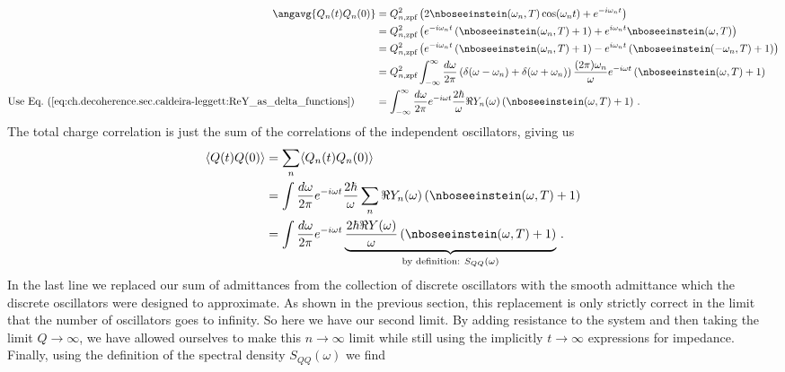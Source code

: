 \begin{align}
  \angavg{Q_n(t) Q_n(0)}
  &= Q_{n,\text{zpf}}^2 \left( 2 \nboseeinstein(\omega_n, T) \cos(\omega_n t) + e^{-i \omega_n t} \right) \nonumber \\
  &= Q_{n,\text{zpf}}^2 \left( e^{-i \omega_n t} \left( \nboseeinstein (\omega_n, T) + 1 \right) + e^{i \omega_n t} \nboseeinstein(\omega, T) \right) \nonumber \\
  &= Q_{n,\text{zpf}}^2 \left( e^{-i \omega_n t} \left( \nboseeinstein (\omega_n, T) + 1 \right) - e^{i \omega_n t} \left( \nboseeinstein(-\omega_n, T) + 1 \right) \right) \nonumber \\
  &= Q_{n,\text{zpf}}^2 \int_{-\infty}^\infty \frac{d\omega}{2\pi}
    \left( \delta(\omega - \omega_n) + \delta(\omega + \omega_n) \right)
    \frac{(2\pi) \omega_n}{\omega} e^{-i \omega t}
    \left( \nboseeinstein(\omega, T) + 1 \right) \nonumber \\
  \text{Use Eq.}~(\ref{eq:ch.decoherence.sec.caldeira-leggett:ReY_as_delta_functions}) \qquad
  &= \int_{-\infty}^\infty \frac{d\omega}{2\pi}
    e^{-i \omega t}
    \frac{2 \hbar}{\omega}
    \Re Y_n(\omega)
    \left( \nboseeinstein(\omega, T) + 1 \right)
  \, .
\end{align}
The total charge correlation is just the sum of the correlations of the independent oscillators, giving us
\begin{align}
  \langle Q(t) Q(0) \rangle
  &= \sum_n \langle Q_n(t) Q_n(0) \rangle \nonumber \\
  &= \int \frac{d\omega}{2 \pi} e^{-i \omega t} \frac{2 \hbar}{\omega} \sum_n \Re Y_n (\omega) \left( \nboseeinstein(\omega, T) + 1 \right) \nonumber \\
  &= \int \frac{d\omega}{2 \pi} e^{-i \omega t} \underbrace{\frac{2 \hbar \Re Y(\omega)}{\omega} \left( \nboseeinstein(\omega, T) + 1 \right)}_{\text{by definition:}~S_{QQ}(\omega)}
  \, .
\end{align}
In the last line we replaced our sum of admittances from the collection of discrete oscillators with the smooth admittance which the discrete oscillators were designed to approximate.
As shown in the previous section, this replacement is only strictly correct in the limit that the number of oscillators goes to infinity.
So here we have our second limit.
By adding resistance to the system and then taking the limit $Q \rightarrow \infty$, we have allowed ourselves to make this $n \rightarrow \infty$ limit while still using the implicitly  $t \rightarrow \infty$ expressions for impedance.
Finally, using the definition of the spectral density $S_{QQ}(\omega)$ we find
